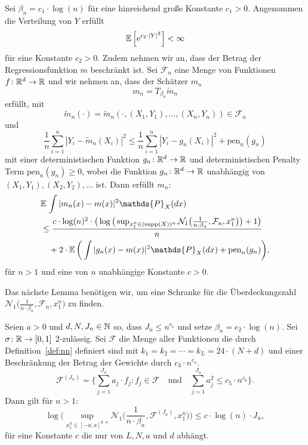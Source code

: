  \begin{lem}
  \label{lem:8}
Sei $\beta_n = c_1 \cdot \log(n)$ für eine hinreichend große Konstante $c_1 > 0$. Angenommen die Verteilung von $Y$ erfüllt 
$$ \mathbb{E}\,\Big[\mathrm{e}^{c_2 \cdot |Y|^2}\Big] < \infty$$
für eine Konstante $c_2 > 0.$ Zudem nehmen wir an, dass der Betrag der Regressionsfunktion $m$ beschränkt ist. Sei $\mathcal{F}_n$ eine Menge von Funktionen $f\colon \mathbb{R}^d \to \mathbb{R}$ und wir nehmen an, dass der Schätzer $m_n$ 
$$m_n = T_{\beta_n}\tilde{m}_n$$ 
erfüllt, mit 
$$\tilde{m}_n(\cdot) = \tilde{m}_n(\cdot,(X_1, Y_1),\dots,(X_n, Y_n)) \in \mathcal{F}_n$$
und 
$$\frac{1}{n} \sum_{i = 1}^n |Y_i - \tilde{m}_n(X_i)|^2 \leq \frac{1}{n}\sum_{i = 1}^n |Y_i - g_{n}(X_i)|^2 + \mathrm{pen}_n(g_n)$$
mit einer deterministischen Funktion $g_{n}\colon \mathbb{R}^d \to \mathbb{R}$ und deterministischen Penalty Term $\mathrm{pen}_n(g_{n}) \geq 0$, wobei die Funktion $g_{n}\colon \mathbb{R}^d \to \mathbb{R}$ unabhängig von $(X_1, Y_1), (X_2, Y_2),\dots$ ist.
Dann erfüllt $m_n\colon$
\begin{equation*}
\begin{split}
& \E \int |m_n(x) - m(x)|^2 \mathds{P}_X(dx) \\
& \leq \frac{c \cdot \log(n)^2 \cdot \big(\log\big(\sup_{x_1^n \in (\supp(X))^n}\mathcal{N}_1\big(\frac{1}{n \cdot \beta_n},\mathcal{F}_n,x_1^n\big)\big) + 1\big)}{n} \\
& \quad + 2 \cdot \E\bigg(\int |g_{n}(x) - m(x)|^2 \mathds{P}_X(dx) + \mathrm{pen}_n(g_{n})\bigg),
\end{split}
\end{equation*}
für $n > 1$ und eine von $n$ unabhängige Konstante $c > 0$.
  \end{lem}
Das nächste Lemma benötigen wir, um eine Schranke für die Überdeckungszahl $\mathcal{N}_1\big(\frac{1}{n \cdot \beta_n},\mathcal{F}_n,x_1^n\big)$ zu finden.
\begin{lem}
\label{lem:9}
Seien $a > 0$ und $d, N, J_n \in \mathbb{N}$ so, dass $J_n \leq n^{c_{1}}$ und setze $\beta_n = c_2 \cdot \log(n).$
Sei $\sigma\colon \mathbb{R} \to [0, 1]$ 2-zulässig. Sei $\mathcal{F}$ die Menge aller Funktionen die durch Definition~\ref{def:nn} definiert sind mit $k_1 = k_2 = \cdots = k_L = 24 \cdot (N + d)$ und einer Beschränkung der Betrag der Gewichte durch $c_{3} \cdot n^{c_{4}}$.
$$ \mathcal{F}^{(J_n)} = \biggl\{\sum_{j = 1}^{J_n} a_j \cdot f_j : f_j \in \mathcal{F} \quad \text{und} \quad \sum_{j = 1}^{J_n} a_j^2 \leq c_{5} \cdot n^{c_{6}}\biggr\}.$$
Dann gilt für $n > 1:$
$$\log\bigg(\sup_{x_1^n\in[-a,a]^{d \cdot n}} \mathcal{N}_1\bigg(\frac{1}{n \cdot \beta_n}, \mathcal{F}^{(J_n)},x_1^n\bigg)\bigg) \leq c \cdot \log(n) \cdot J_n,$$
für eine Konstante $c$ die nur von $L, N, a$ und $d$ abhängt.
\end{lem}

